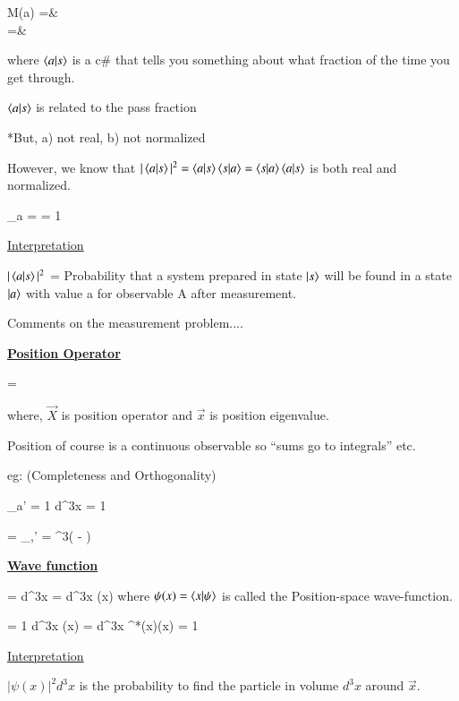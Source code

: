 {\bea
M(a) =& \\
            =& 
\eea

where $\braket{a|s}$ is a c\# that tells you something about what fraction of the time you get through. 


$\braket{a|s}$ is related to the pass fraction

*But, a) not real,  b) not normalized

However, we know that $|\braket{a|s}|^2 = \braket{a|s}\braket{s|a} = \braket{s|a}\braket{a|s}$
is both real and normalized. 

\be
\sum\limits_{a}  =  = 1
\ee

\underline{Interpretation}

$|\braket{a|s}|^2$ = Probability that a system prepared in state $\ket{s}$ will be found in a state $\ket{a}$ with value a for observable A after measurement. 


Comments on the measurement problem....


\clearpage

\textbf{\underline{Position Operator}}

\be
{}  = 
\ee

where, $\vec{X}$ is position operator and $\vec{x}$ is position eigenvalue.

Position of course is a continuous observable so ``sums go to integrals'' etc.

eg: (Completeness and Orthogonality)

\be
\sum\limits_{a'}  = 1   \Rightarrow \int d^3x  = 1
\ee

\be
{} = \delta_{\alpha,\alpha'}   \Rightarrow {} = \delta^3( - )
\ee


\textbf{\underline{Wave function}}

\be
\ket{\psi} = \int d^3x  = \int d^3x \psi(x)
\ee
where $\psi(x) = \braket{x|\psi}$ is called the Position-space wave-function.

\be
\braket{\psi|\psi} = 1  \Rightarrow \int d^3x \psi(x) = \int d^3x \psi^*(x)\psi(x) = 1
\ee

\underline{Interpretation}

 $|\psi(x)|^2d^3x$ is the probability to find the particle in volume $d^3x$ around $\vec{x}$.


\clearpage

}
